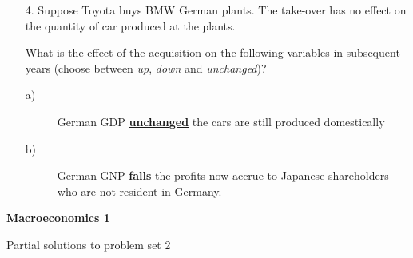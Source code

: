 \documentclass[12pt,a4paper]{article}
\begin{document}
\begin{enumerate}






\item [4.] Suppose Toyota buys BMW German plants. The take-over has no effect on
the quantity of car produced at the plants.

What is the effect of the acquisition on the following variables in subsequent
years (choose between \emph{up}, \emph{down} and \emph{unchanged})?

\begin{description}
\item [a)]German GDP \underline{\textbf{unchanged}} the cars are still
produced domestically

\item[b)] German GNP \textbf{falls }the profits now accrue to Japanese
shareholders who are not resident in Germany.\newpage
\end{description}
\end{enumerate}

\begin{center}
\textbf{Macroeconomics 1}

Partial solutions to problem set 2
\end{center}

\end{document}
